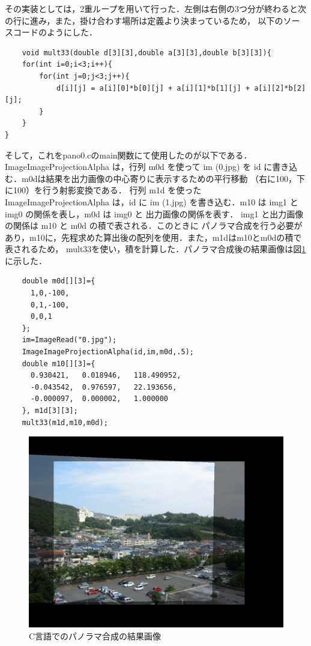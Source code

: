 \documentclass[11pt]{jarticle}
\begin{document}
その実装としては，2重ループを用いて行った．左側は右側の3つ分が終わると次の行に進み，また，掛け合わす場所は定義より決まっているため，
以下のソースコードのようにした．
\begin{verbatim}
    void mult33(double d[3][3],double a[3][3],double b[3][3]){
    for(int i=0;i<3;i++){
        for(int j=0;j<3;j++){
            d[i][j] = a[i][0]*b[0][j] + a[i][1]*b[1][j] + a[i][2]*b[2][j]; 
        }
    }
}
\end{verbatim}
そして，これをpano0.cのmain関数にて使用したのが以下である．
ImageImageProjectionAlpha は，行列 m0d を使って im (0.jpg) を id に書き込む．m0dは結果を出力画像の中心寄りに表示するための平行移動
（右に100，下に100）を行う射影変換である．
行列 m1d を使った ImageImageProjectionAlpha は，id に im (1.jpg) を書き込む．m10 は img1 と img0 の関係を表し，m0d は img0 と 出力画像の関係を表す．
img1 と出力画像の関係は m10 と m0d の積で表される．このときに
パノラマ合成を行う必要があり，m10に，先程求めた算出後の配列を使用．また，m1dはm10とm0dの積で表されるため，
mult33を使い，積を計算した．パノラマ合成後の結果画像は図\ref{panorama}に示した．

\begin{verbatim}
    double m0d[][3]={
      1,0,-100,
      0,1,-100,
      0,0,1
    };
    im=ImageRead("0.jpg");
    ImageImageProjectionAlpha(id,im,m0d,.5);
    double m10[][3]={
      0.930421,   0.018946,   118.490952,
      -0.043542,  0.976597,   22.193656,
      -0.000097,  0.000002,   1.000000 
    }, m1d[3][3];
    mult33(m1d,m10,m0d);
\end{verbatim}

\begin{figure}[h]
    \centering
    \includegraphics[scale=.3]{panorama.png}
    \caption{C言語でのパノラマ合成の結果画像}
    \label{panorama}
\end{figure}
\end{document}
